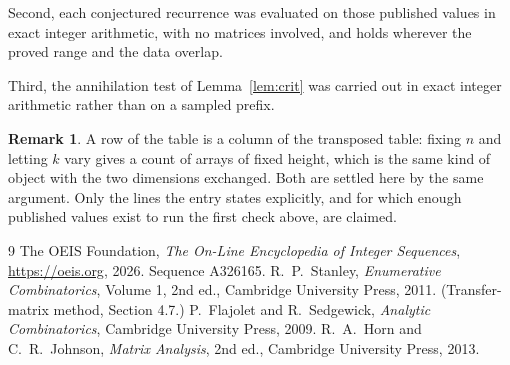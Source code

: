 \documentclass[11pt,a4paper]{article}
\theoremstyle{plain}
\theoremstyle{definition}
\newtheorem{remark}[theorem]{Remark}
\begin{document}
Second, each conjectured recurrence was evaluated on those published values in exact
integer arithmetic, with no matrices involved, and holds wherever the proved range and the
data overlap.

Third, the annihilation test of Lemma~\ref{lem:crit} was carried out in exact integer
arithmetic rather than on a sampled prefix.

\begin{remark}
A row of the table is a column of the transposed table: fixing $n$ and letting $k$ vary gives a
count of arrays of fixed height, which is the same kind of object with the two dimensions
exchanged. Both are settled here by the same argument. Only the lines the entry states
explicitly, and for which enough published values exist to run the first check above, are
claimed.
\end{remark}

\begin{thebibliography}{9}
 The OEIS Foundation, \emph{The On-Line Encyclopedia of Integer
Sequences}, \url{https://oeis.org}, 2026. Sequence A326165.
 R.~P.~Stanley, \emph{Enumerative Combinatorics}, Volume 1, 2nd ed.,
Cambridge University Press, 2011. (Transfer-matrix method, Section 4.7.)
 P.~Flajolet and R.~Sedgewick, \emph{Analytic Combinatorics}, Cambridge
University Press, 2009.
 R.~A.~Horn and C.~R.~Johnson, \emph{Matrix Analysis}, 2nd ed., Cambridge
University Press, 2013.
\end{thebibliography}
\end{document}
